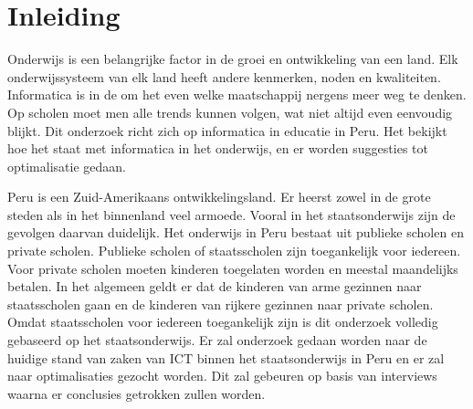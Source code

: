 \chapter{Inleiding}
\label{ch:inleiding}

Onderwijs is een belangrijke factor in de groei en ontwikkeling van een land. Elk onderwijssysteem van elk land heeft andere kenmerken, noden en kwaliteiten. Informatica is in de om het even welke maatschappij nergens meer weg te denken. Op scholen moet men alle trends kunnen volgen, wat niet altijd even eenvoudig blijkt. Dit onderzoek richt zich op informatica in educatie in Peru. Het bekijkt hoe het staat met informatica in het onderwijs, en er worden suggesties tot optimalisatie gedaan.

Peru is een Zuid-Amerikaans ontwikkelingsland. Er heerst zowel in de grote steden als in het binnenland veel armoede. Vooral in het staatsonderwijs zijn de gevolgen daarvan duidelijk. Het onderwijs in Peru bestaat uit publieke scholen en private scholen. Publieke scholen of staatsscholen zijn toegankelijk voor iedereen. Voor private scholen moeten kinderen toegelaten worden en meestal maandelijks betalen. In het algemeen geldt er dat de kinderen van arme gezinnen naar staatsscholen gaan en de kinderen van rijkere gezinnen naar private scholen. Omdat staatsscholen voor iedereen toegankelijk zijn is dit onderzoek volledig gebaseerd op het staatsonderwijs. Er zal onderzoek gedaan worden naar de huidige stand van zaken van ICT binnen het staatsonderwijs in Peru en er zal naar optimalisaties gezocht worden. Dit zal gebeuren op basis van interviews waarna er conclusies getrokken zullen worden.



